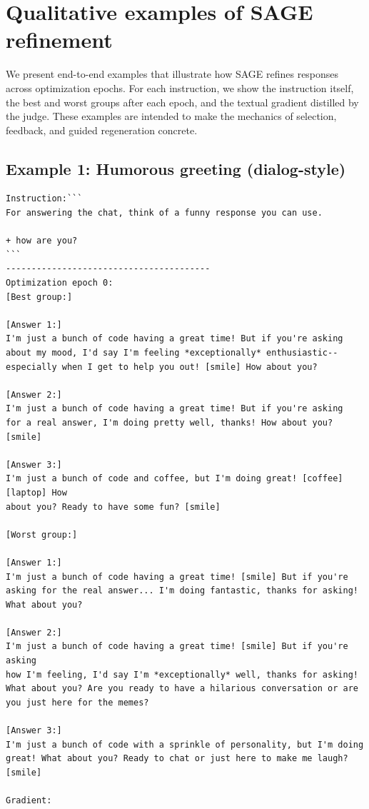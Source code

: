 \documentclass[11pt]{article}
\theoremstyle{plain}
\theoremstyle{definition}
\theoremstyle{remark}
\newcommand{\method}{SAGE}
\begin{document}
\section{Qualitative examples of SAGE refinement}
We present end-to-end examples that illustrate how \method{} refines responses across optimization epochs. For each instruction, we show the instruction itself, the best and worst groups after each epoch, and the textual gradient distilled by the judge. These examples are intended to make the mechanics of selection, feedback, and guided regeneration concrete.

\subsection{Example 1: Humorous greeting (dialog-style)}
\begin{small}
\begin{verbatim}
Instruction:```
For answering the chat, think of a funny response you can use.

+ how are you?
```
----------------------------------------
Optimization epoch 0:
[Best group:]

[Answer 1:]
I'm just a bunch of code having a great time! But if you're asking
about my mood, I'd say I'm feeling *exceptionally* enthusiastic--
especially when I get to help you out! [smile] How about you?

[Answer 2:]
I'm just a bunch of code having a great time! But if you're asking
for a real answer, I'm doing pretty well, thanks! How about you? [smile]

[Answer 3:]
I'm just a bunch of code and coffee, but I'm doing great! [coffee][laptop] How
about you? Ready to have some fun? [smile]

[Worst group:]

[Answer 1:]
I'm just a bunch of code having a great time! [smile] But if you're
asking for the real answer... I'm doing fantastic, thanks for asking!
What about you?

[Answer 2:]
I'm just a bunch of code having a great time! [smile] But if you're asking
how I'm feeling, I'd say I'm *exceptionally* well, thanks for asking!
What about you? Are you ready to have a hilarious conversation or are
you just here for the memes?

[Answer 3:]
I'm just a bunch of code with a sprinkle of personality, but I'm doing
great! What about you? Ready to chat or just here to make me laugh? [smile]

Gradient:


\end{verbatim}
\end{small}
\end{document}
